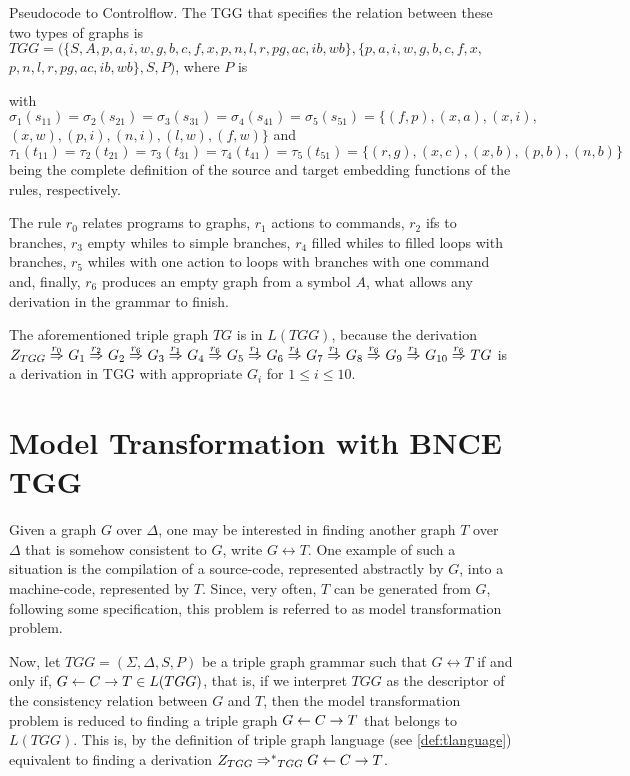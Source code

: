 \documentclass[runningheads]{llncs}
\begin{document}
\begin{example}{Pseudocode to Controlflow.}
	The TGG that specifies the relation between these two types of graphs is $TGG = (\{S, A, p, a, i, w, g, b, c, f, x, p, n, l, r, pg, ac, ib, wb\}, \{p, a, i, w, g, b, c, f, x,$ $ p, n, l, r, pg, ac, ib, wb\}, S, P)$, where $P$ is
	
	
	
	\noindent
	with $\sigma_1(s_{11}) = \sigma_2(s_{21}) = \sigma_3(s_{31}) = \sigma_4(s_{41}) =\sigma_5(s_{51}) = \{ (f,p), (x,a), (x,i),$ $ (x,w), (p,i), (n,i), (l,w), (f,w) \}$ and $\tau_1(t_{11}) = \tau_2(t_{21}) = \tau_3(t_{31}) = \tau_4(t_{41}) =\tau_5(t_{51}) = \{ (r,g), (x,c), (x,b), (p,b), (n,b)\}$ being the complete definition of the source and target embedding functions of the rules, respectively.
	
	The rule $r_0$ relates programs to graphs, $r_1$ actions to commands, $r_2$ ifs to branches, $r_3$ empty whiles to simple branches, $r_4$ filled whiles to filled loops with branches, $r_5$ whiles with one action to loops with branches with one command and, finally, $r_6$ produces an empty graph from a symbol $A$, what allows any derivation in the grammar to finish.
	
	The aforementioned triple graph $TG$ is in $L(TGG)$, because the derivation
	$
	\startTG{TGG} \tderiv{r_0}{}{} G_1 \tderiv{r_2}{}{} G_2 \tderiv{r_6}{}{} G_3 \tderiv{r_1}{}{} G_4 \tderiv{r_6}{}{} G_5 \tderiv{r_1}{}{} G_6 \tderiv{r_4}{}{} G_7 \tderiv{r_1}{}{} G_8 \tderiv{r_6}{}{} G_9 \tderiv{r_1}{}{} G_{10} \tderiv{r_6}{}{} TG
	$
	is a derivation in TGG with appropriate $G_i$ for $1 \le i \le 10$.
\end{example}

\section{Model Transformation with BNCE TGG}
\label{sec:modeltrans}
Given a graph $G$ over $\Delta$, one may be interested in finding another graph $T$ over $\Delta$ that is somehow consistent to $G$, write $G \rel T$. One example of such a situation is the compilation of a source-code, represented abstractly by $G$, into a machine-code, represented by $T$. Since, very often, $T$ can be generated from $G$, following some specification, this problem is referred to as model transformation problem.

Now, let $TGG = (\Sigma, \Delta, S, P)$ be a triple graph grammar such that $G \rel T$ if and only if, $G \overset{}{\leftarrow} C \overset{}{\rightarrow} T \in L(TGG)$, that is, if we interpret $TGG$ as the descriptor of the consistency relation between $G$ and $T$, then the model transformation problem is reduced to finding a triple graph $G \overset{}{\leftarrow} C \overset{}{\rightarrow} T$ that belongs to $L(TGG)$. This is, by the definition of triple graph language (see \ref{def:tlanguage}) equivalent to finding a derivation $\startTG{TGG} \tderivtr{}{}{TGG} G \ms{} C \mt{} T$.
\end{document}
